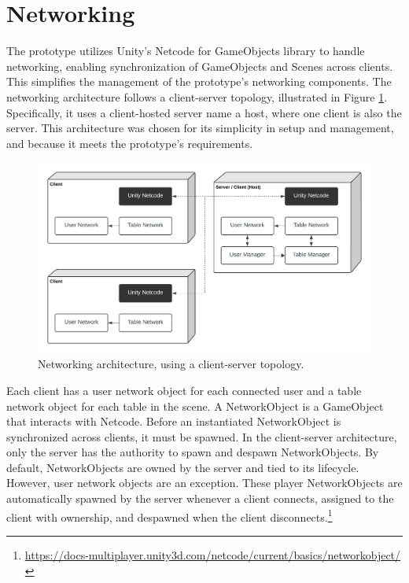 \section{Networking}

    The prototype utilizes Unity's Netcode for GameObjects library to handle networking, enabling synchronization of GameObjects and Scenes across clients. This simplifies the management of the prototype's networking components. The networking architecture follows a client-server topology, illustrated in Figure \ref{fig:topology}. Specifically, it uses a client-hosted server name a host, where one client is also the server. This architecture was chosen for its simplicity in setup and management, and because it meets the prototype's requirements.

    \begin{figure}[h]
        \centering
        \includegraphics[width=.9\linewidth]{figures/topology.png}
        \caption{Networking architecture, using a client-server topology.}
        \label{fig:topology}
    \end{figure}

    Each client has a user network object for each connected user and a table network object for each table in the scene. A NetworkObject is a GameObject that interacts with Netcode. Before an instantiated NetworkObject is synchronized across clients, it must be spawned. In the client-server architecture, only the server has the authority to spawn and despawn NetworkObjects. By default, NetworkObjects are owned by the server and tied to its lifecycle. However, user network objects are an exception. These player NetworkObjects are automatically spawned by the server whenever a client connects, assigned to the client with ownership, and despawned when the client disconnects.\footnote{\url{https://docs-multiplayer.unity3d.com/netcode/current/basics/networkobject/}}


